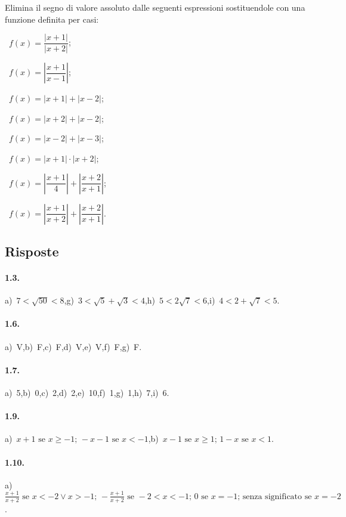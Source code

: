\begin{esercizio}[\Ast]
\label{ese:1.10}
 Elimina il segno di valore assoluto dalle seguenti espressioni sostituendole con una funzione definita per casi:
 \begin{multicols}{2}
 \begin{enumeratea}
 \item~$f(x)=\dfrac{\left|x+1\right|}{\left|x+2\right|}$;
 \item~$f(x)=\left|\dfrac{x+1}{x-1}\right|$;
 \item~$f(x)=\left|x+1\right|+\left|x-2\right|$;
 \item~$f(x)=\left|x+2\right|+\left|x-2\right|$;
 \item~$f(x)=\left|x-2\right|+\left|x-3\right|$;
 \item~$f(x)=\left|x+1\right|\cdot \left|x+2\right|$;
 \item~$f(x)=\left|\dfrac{x+1} 4\right|+\left|\dfrac{x+2}{x+1}\right|$;
 \item~$f(x)=\left|\dfrac{x+1}{x+2}\right|+\left|\dfrac{x+2}{x+1}\right|$.
 \end{enumeratea}
 \end{multicols}
\end{esercizio}

\subsection{Risposte}

\paragraph{1.3.}
a)~$7<\sqrt{50}<8$,\quad g)~$3<\sqrt{5}+\sqrt{3}<4$,\quad h)~$5<2\sqrt{7}<6$,\quad i)~$4<2+\sqrt{7}<5$.

\paragraph{1.6.}
a)~V,\quad b)~F,\quad c)~F,\quad d)~V,\quad e)~V,\quad f)~F,\quad g)~F.

\paragraph{1.7.}
a)~5,\quad b)~0,\quad c)~2,\quad d)~2,\quad e)~10,\quad f)~1,\quad g)~1,\quad h)~7,\quad i)~6.

\paragraph{1.9.}
a)~${x+1}\text{ se }x\ge-1\text{; }-x-1\text{ se }x<-1$,\quad b)~${x-1}\text{ se }x\ge 1\text{; }1-x\text{ se }x<1$.

\paragraph{1.10.}
a)~$\frac{x+1}{x+2}\text{ se }x<-2 \vee x>-1\text{; }-\frac{x+1}{x+2}\text{ se }-2<x<-1\text{; }0\text{ se }x=-1\text{; senza significato se }x=-2$.
